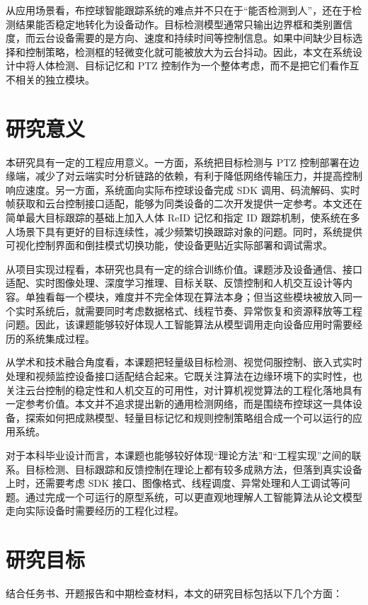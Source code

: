 从应用场景看，布控球智能跟踪系统的难点并不只在于“能否检测到人”，还在于检测结果能否稳定地转化为设备动作。目标检测模型通常只输出边界框和类别置信度，而云台设备需要的是方向、速度和持续时间等控制信息。如果中间缺少目标选择和控制策略，检测框的轻微变化就可能被放大为云台抖动。因此，本文在系统设计中将人体检测、目标记忆和 PTZ 控制作为一个整体考虑，而不是把它们看作互不相关的独立模块。

\section{研究意义}

本研究具有一定的工程应用意义。一方面，系统把目标检测与 PTZ 控制部署在边缘端，减少了对云端实时分析链路的依赖，有利于降低网络传输压力，并提高控制响应速度。另一方面，系统面向实际布控球设备完成 SDK 调用、码流解码、实时帧获取和云台控制接口适配，能够为同类设备的二次开发提供一定参考。本文还在简单最大目标跟踪的基础上加入人体 ReID 记忆和指定 ID 跟踪机制，使系统在多人场景下具有更好的目标连续性，减少频繁切换跟踪对象的问题。同时，系统提供可视化控制界面和倒挂模式切换功能，使设备更贴近实际部署和调试需求。

从项目实现过程看，本研究也具有一定的综合训练价值。课题涉及设备通信、接口适配、实时图像处理、深度学习推理、目标关联、反馈控制和人机交互设计等内容。单独看每一个模块，难度并不完全体现在算法本身；但当这些模块被放入同一个实时系统后，就需要同时考虑数据格式、线程节奏、异常恢复和资源释放等工程问题。因此，该课题能够较好体现人工智能算法从模型调用走向设备应用时需要经历的系统集成过程。

从学术和技术融合角度看，本课题把轻量级目标检测、视觉伺服控制、嵌入式实时处理和视频监控设备接口适配结合起来。它既关注算法在边缘环境下的实时性，也关注云台控制的稳定性和人机交互的可用性，对计算机视觉算法的工程化落地具有一定参考价值。本文并不追求提出新的通用检测网络，而是围绕布控球这一具体设备，探索如何把成熟模型、轻量目标记忆和规则控制策略组合成一个可以运行的应用系统。

对于本科毕业设计而言，本课题也能够较好体现“理论方法”和“工程实现”之间的联系。目标检测、目标跟踪和反馈控制在理论上都有较多成熟方法，但落到真实设备上时，还需要考虑 SDK 接口、图像格式、线程调度、异常处理和人工调试等问题。通过完成一个可运行的原型系统，可以更直观地理解人工智能算法从论文模型走向实际设备时需要经历的工程化过程。

\section{研究目标}

结合任务书、开题报告和中期检查材料，本文的研究目标包括以下几个方面：


